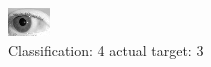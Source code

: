 \begin{figure}[h!]
\begin{center}
\includegraphics[width=0.60\columnwidth]{figures/ID201_class_4_target_3.png}
\end{center}
\caption{ Classification: 4 actual target: 3}
\label{fig:ID201_class_4_target_3}
\end{figure}
